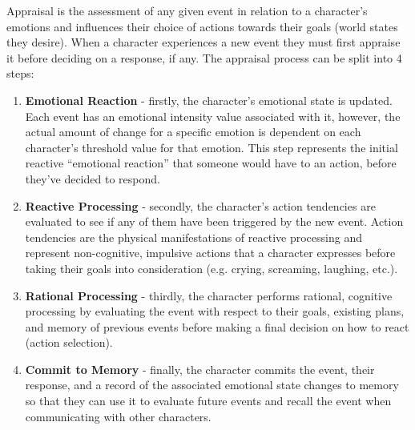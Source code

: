 \documentclass{sig-alternate-05-2015}
\begin{document}
\noindent Appraisal is the assessment of any given event in relation to a character's emotions and influences their choice of actions towards their goals (world states they desire). When a character experiences a new event they must first appraise it before deciding on a response, if any. The appraisal process can be split into 4 steps:
\begin{enumerate}
	\item \textbf{Emotional Reaction} - firstly, the character's emotional state is updated. Each event has an emotional intensity value associated with it, however, the actual amount of change for a specific emotion is dependent on each character's threshold value for that emotion. This step represents the initial reactive ``emotional reaction'' that someone would have to an action, before they've decided to respond.
	\item \textbf{Reactive Processing} - secondly, the character's action tendencies are evaluated to see if any of them have been triggered by the new event. Action tendencies are the physical manifestations of reactive processing and represent non-cognitive, impulsive actions that a character expresses before taking their goals into consideration (e.g. crying, screaming, laughing, etc.).
	\item \textbf{Rational Processing} - thirdly, the character performs rational, cognitive processing by evaluating the event with respect to their goals, existing plans, and memory of previous events before making a final decision on how to react (action selection).
	\item \textbf{Commit to Memory} - finally, the character commits the event, their response, and a record of the associated emotional state changes to memory so that they can use it to evaluate future events and recall the event when communicating with other characters.
\end{enumerate}
\end{document}
